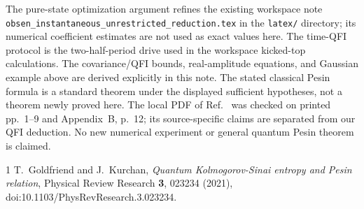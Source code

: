 \documentclass[11pt,a4paper]{article}
\begin{document}
The pure-state optimization argument refines the existing workspace note \texttt{obsen\_instantaneous\_unrestricted\_reduction.tex} in the \texttt{latex/} directory; its numerical coefficient estimates are not used as exact values here. The time-QFI protocol is the two-half-period drive used in the workspace kicked-top calculations. The covariance/QFI bounds, real-amplitude equations, and Gaussian example above are derived explicitly in this note. The stated classical Pesin formula is a standard theorem under the displayed sufficient hypotheses, not a theorem newly proved here. The local PDF of Ref.~\cite{GK} was checked on printed pp.~1--9 and Appendix~B, p.~12; its source-specific claims are separated from our QFI deduction. No new numerical experiment or general quantum Pesin theorem is claimed.
\begin{thebibliography}{1}
 T.~Goldfriend and J.~Kurchan, \emph{Quantum Kolmogorov-Sinai entropy and Pesin relation}, Physical Review Research \textbf{3}, 023234 (2021), doi:10.1103/PhysRevResearch.3.023234.
\end{thebibliography}
\end{document}
